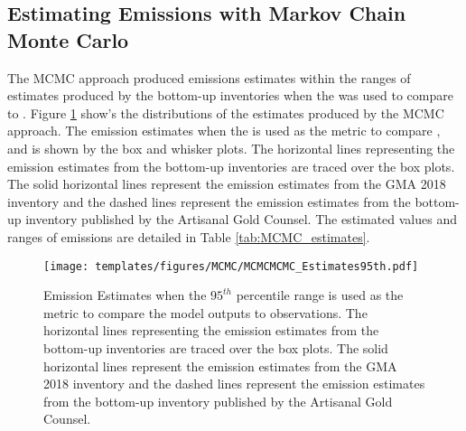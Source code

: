 \subsection{Estimating Emissions with Markov Chain Monte Carlo}
The MCMC approach produced \hg emissions estimates within the ranges of estimates produced by the bottom-up inventories when the \nft was used to compare \obsC to \modelc. Figure \ref{fig:MCMC_estimates95th} show's the distributions of the estimates produced by the MCMC approach. The \hg emission estimates when the \nft is used as the metric to compare \modelc, and \obsC is shown by the box and whisker plots. The horizontal lines representing the emission estimates from the bottom-up inventories are traced over the box plots. The solid horizontal lines represent the emission estimates from the GMA 2018 inventory \cite{united_nations_environment_programme_technical_2019,steenhuisen_development_2019} and the dashed lines represent the emission estimates from the bottom-up inventory published by the Artisanal Gold Counsel\cite{agc_reporte_2017}. The estimated values and ranges of emissions are detailed in Table \ref{tab:MCMC_estimates}. 
\begin{figure}[H]
  \texttt{[image: templates/figures/MCMC/MCMCMCMC\_Estimates95th.pdf]}
  \centering
  \caption{Emission Estimates when the $95^{th}$ percentile range is used as the metric to compare the model outputs to observations. The horizontal lines representing the emission estimates from the bottom-up inventories are traced over the box plots. The solid horizontal lines represent the emission estimates from the GMA 2018 inventory \cite{united_nations_environment_programme_technical_2019,steenhuisen_development_2019} and the dashed lines represent the emission estimates from the bottom-up inventory published by the Artisanal Gold Counsel\cite{agc_reporte_2017}.}
  \label{fig:MCMC_estimates95th}
\end{figure}
\FloatBarrier

